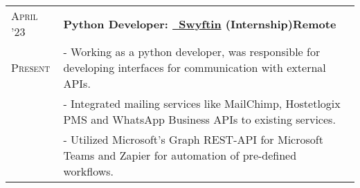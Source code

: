 \documentclass[a4paper,10pt]{extarticle} %
\begin{document}
\begin{tabularx}{\linewidth}{ l | X }
\textsc{April '23} & \textbf{Python Developer: {\href{https://www.swyftin.com/}{\ Swyftin} (Internship)}}\hfill\textbf{Remote}\\
\textsc{Present}& {- Working as a python developer, was responsible for developing interfaces for communication with external APIs.}\\
& {- Integrated mailing services like MailChimp, Hostetlogix PMS and WhatsApp Business APIs to existing services.}\\
& {- Utilized Microsoft's Graph REST-API for Microsoft Teams and Zapier for automation of pre-defined workflows.}\\





\end{tabularx}
\end{document}
